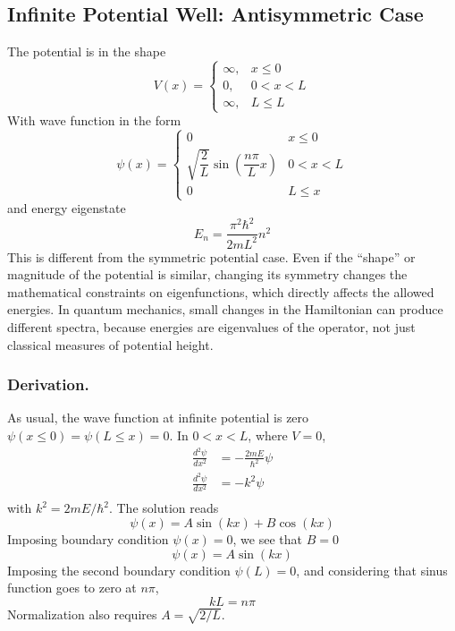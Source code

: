 \documentclass[../../../main.tex]{subfiles}
\begin{document}
\subsection{Infinite Potential Well: Antisymmetric Case}
The potential is in the shape
\begin{equation*}
    V(x)=
    \begin{cases}
        \infty, & x \leq0  \\
        0,      & 0<x<L    \\
        \infty, & L \leq L
    \end{cases}
\end{equation*}
With wave function in the form 
\begin{equation*}
    \psi(x)=\begin{cases}
        0                                          & x\leq 0   \\
        \sqrt{\dfrac{2}{L}}\sin( \dfrac{n\pi}{L}x) & 0 < x < L \\
        0                                          & L \leq x
    \end{cases}
\end{equation*}
and energy eigenstate
\begin{equation*}
    E_n=\frac{\pi^2\hbar^2}{2mL^2}n^2
\end{equation*}
This is different from the symmetric potential case.
Even if the “shape” or magnitude of the potential is similar, changing its symmetry changes the mathematical constraints on eigenfunctions, which directly affects the allowed energies.
In quantum mechanics, small changes in the Hamiltonian can produce different spectra, because energies are eigenvalues of the operator, not just classical measures of potential height.

\subsubsection{Derivation.}
As usual, the wave function at infinite potential is zero $\psi(x \leq 0)=\psi(L\leq x)=0$.
In $0 < x < L$, where $ V = 0$,
\begin{align*}
    \frac{d^2\psi}{dx^2} & = -\frac{2mE}{\hbar^2}\psi \\
    \frac{d^2\psi}{dx^2} & = -k^2\psi                 \\
\end{align*}
with $k^2 =2 m E/\hbar^2$.
The solution reads
\begin{equation*}
    \psi(x)=A\sin (kx)+ B \cos (kx)
\end{equation*}
Imposing boundary condition $\psi(x)=0$, we see that $B=0$
\begin{equation*}
    \psi(x)=A\sin (kx)
\end{equation*}
Imposing the second boundary condition $\psi(L)=0$, and considering that sinus function goes to zero at $n\pi$,
\begin{equation*}
    kL=n\pi
\end{equation*}
Normalization also requires $A = \sqrt{2/L}$.
\end{document}
